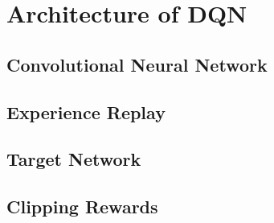 \section{Architecture of DQN}


\subsection{Convolutional Neural Network}
\subsection{Experience Replay}
\subsection{Target Network}
\subsection{Clipping Rewards}
